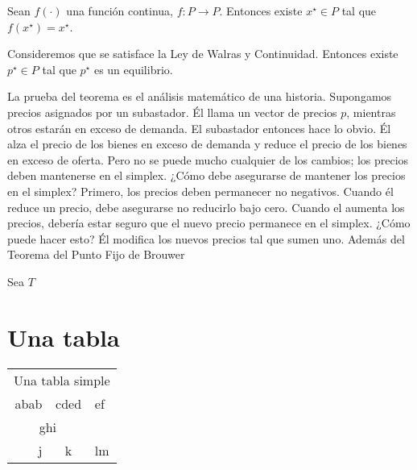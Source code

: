 \documentclass{12pt,a4paper}{report}%
\begin{document}
Sean $f(\cdot)$ una función continua, $f:P\rightarrow P$. Entonces existe $x^{\star}\in P$ tal que $f(x^{\star})=x^{\star}$.

Consideremos que se satisface la Ley de Walras y Continuidad. Entonces existe $p^{\star}\in P$ tal que $p^{\star}$ es un equilibrio.

La prueba del teorema es el análisis matemático de una historia. Supongamos precios asignados por un subastador. Él llama un vector de precios $p$, mientras otros estarán en exceso de demanda. El subastador entonces hace lo obvio. Él alza el precio de los bienes en exceso de demanda y reduce el precio de los bienes en exceso de oferta. Pero no se puede mucho cualquier de los cambios; los precios deben mantenerse en el simplex. ¿Cómo debe asegurarse de mantener los precios en el simplex? Primero, los precios deben permanecer no negativos. Cuando él reduce un precio, debe asegurarse no reducirlo bajo cero. Cuando el aumenta los precios, debería estar seguro que el nuevo precio permanece en el simplex. ¿Cómo puede hacer esto? Él modifica los nuevos precios tal que sumen uno. Además del Teorema del Punto Fijo de Brouwer%

Sea $T$
\section{Una tabla}

\begin{table}
\centering
\begin{tabular}{rcl}
\multicolumn{3}{|c|}{Una tabla simple} \\
abab & cded & ef \\
\multicolumn{2}{c}{ghi} & \\
j & k & lm
\end{tabular}
\end{table}
\end{document}
